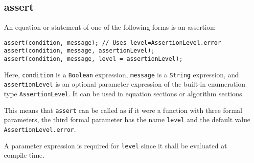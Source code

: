 \subsection{assert}\label{assert}

An equation or statement of one of the following forms is an assertion:
\begin{lstlisting}[language=modelica]
assert(condition, message); // Uses level=AssertionLevel.error
assert(condition, message, assertionLevel);
assert(condition, message, level = assertionLevel);
\end{lstlisting}
Here, \lstinline!condition! is a \lstinline!Boolean! expression, \lstinline!message! is a \lstinline!String! expression, and \lstinline!assertionLevel! is an optional parameter expression of the built-in enumeration type \lstinline!AssertionLevel!.
It can be used in equation sections or algorithm sections.

\begin{nonnormative}
This means that \lstinline!assert! can be called as if it were a function with three formal parameters, the third formal parameter has the name \lstinline!level! and the default value \lstinline!AssertionLevel.error!.
\end{nonnormative}

\begin{nonnormative}
A parameter expression is required for \lstinline!level! since it shall be evaluated at compile time.
\end{nonnormative}

